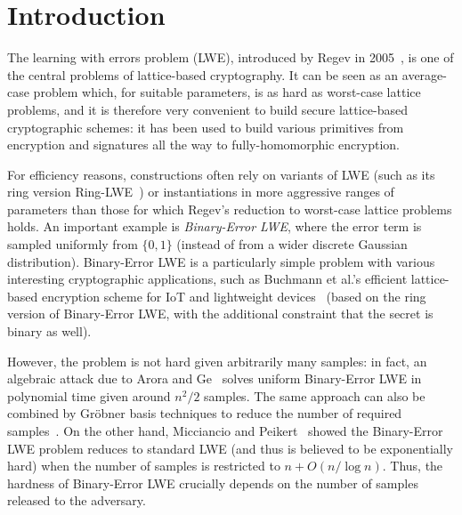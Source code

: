 \documentclass[a4paper]{article}
\theoremstyle{definition}
\theoremstyle{remark}
\begin{document}

\maketitle

\section{Introduction}

The learning with errors problem (LWE), introduced by Regev in
2005~\cite{regev2010learning}, is one of the central problems of
lattice-based cryptography. It can be seen as an average-case problem
which, for suitable parameters, is as hard as worst-case lattice
problems, and it is therefore very convenient to build secure
lattice-based cryptographic schemes: it has been used to build various
primitives from encryption and signatures all the way to
fully-homomorphic encryption.

For efficiency reasons, constructions often rely on variants of LWE (such
as its ring version Ring-LWE~\cite{lyubashevsky2010ideal}) or
instantiations in more aggressive ranges of parameters than those for
which Regev's reduction to worst-case lattice problems holds. An
important example is \emph{Binary-Error LWE}, where the error term is
sampled uniformly from $\{0,1\}$ (instead of from a wider discrete
Gaussian distribution). Binary-Error LWE is a particularly simple
problem with various interesting cryptographic applications, such as
Buchmann et al.'s efficient lattice-based encryption scheme for IoT and
lightweight devices~\cite{buchmann2016high} (based on the ring version of
Binary-Error LWE, with the additional constraint that the secret is
binary as well).

However, the problem is not hard given arbitrarily many samples: in fact,
an algebraic attack due to Arora and Ge~\cite{arora2011new} solves
uniform Binary-Error LWE in polynomial time given around $n^2/2$ samples. The
same approach can also be combined by Gr\"obner basis techniques to
reduce the number of required samples~\cite{albrecht2015concrete}. On the other hand,
Micciancio and Peikert~\cite{micciancio2013hardness} showed the
Binary-Error LWE problem reduces to standard LWE (and thus is believed to
be exponentially hard) when the number of samples is restricted to $n +
O(n/\log n)$. Thus, the hardness of Binary-Error LWE crucially depends on
the number of samples released to the adversary.
\end{document}
